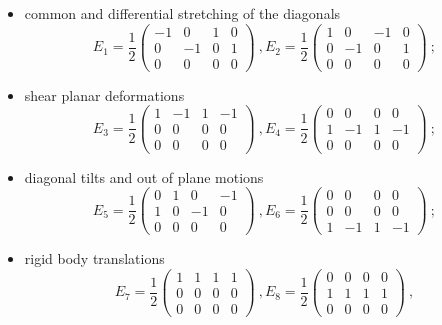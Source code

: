\documentclass[12pt,a4paper,final]{iopart}
\begin{document}
\begin{itemize}
\item common and differential stretching of the diagonals
\[
 E_{1}=\frac{1}{2}\left(\begin{array}{cccc}
-1 & 0 & 1 & 0\\
0 & -1 & 0 & 1\\
0 & 0 & 0 & 0
\end{array}\right)\ ,
E_{2}=\frac{1}{2}\left(\begin{array}{cccc}
1 & 0 & -1 & 0\\
0 & -1 & 0 & 1\\
0 & 0 & 0 & 0
\end{array}\right)\ ;
\]
\item shear planar deformations
\[
E_{3}=\frac{1}{2}\left(\begin{array}{cccc}
1 & -1 & 1 & -1\\
0 & 0 & 0 & 0\\
0 & 0 & 0 & 0
\end{array}\right)\ ,
E_{4}=\frac{1}{2}\left(\begin{array}{cccc}
0 & 0 & 0 & 0\\
1 & -1 & 1 & -1\\
0 & 0 & 0 & 0
\end{array}\right)\ ;
\]
\item diagonal tilts and out of plane motions
\[
E_{5}=\frac{1}{2}\left(\begin{array}{cccc}
0 & 1 & 0 & -1\\
1 & 0 & -1 & 0\\
0 & 0 & 0 & 0
\end{array}\right)\ ,
E_{6}=\frac{1}{2}\left(\begin{array}{cccc}
0 & 0 & 0 & 0\\
0 & 0 & 0 & 0\\
1 & -1 & 1 & -1
\end{array}\right)\ ;
\]
\item rigid body translations 
\[
E_{7}=\frac{1}{2}\left(\begin{array}{cccc}
1 & 1 & 1 & 1\\
0 & 0 & 0 & 0\\
0 & 0 & 0 & 0
\end{array}\right)\ ,
E_{8}=\frac{1}{2}\left(\begin{array}{cccc}
0 & 0 & 0 & 0\\
1 & 1 & 1 & 1\\
0 & 0 & 0 & 0
\end{array}\right)\ ,
\]
\smallskip
\[
\]
\end{itemize}
\end{document}

